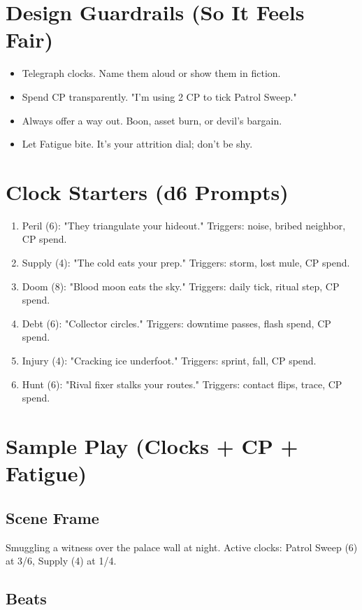 \section{Design Guardrails (So It Feels Fair)}

\begin{itemize}
\item Telegraph clocks. Name them aloud or show them in fiction.
\item Spend CP transparently. "I'm using 2 CP to tick Patrol Sweep."
\item Always offer a way out. Boon, asset burn, or devil's bargain.
\item Let Fatigue bite. It's your attrition dial; don't be shy.
\end{itemize}

\section{Clock Starters (d6 Prompts)}

\begin{enumerate}
\item Peril (6): "They triangulate your hideout." Triggers: noise, bribed neighbor, CP spend.
\item Supply (4): "The cold eats your prep." Triggers: storm, lost mule, CP spend.
\item Doom (8): "Blood moon eats the sky." Triggers: daily tick, ritual step, CP spend.
\item Debt (6): "Collector circles." Triggers: downtime passes, flash spend, CP spend.
\item Injury (4): "Cracking ice underfoot." Triggers: sprint, fall, CP spend.
\item Hunt (6): "Rival fixer stalks your routes." Triggers: contact flips, trace, CP spend.
\end{enumerate}

\section{Sample Play (Clocks + CP + Fatigue)}

\subsection{Scene Frame}
Smuggling a witness over the palace wall at night. Active clocks: Patrol Sweep (6) at 3/6, Supply (4) at 1/4.

\subsection{Beats}

